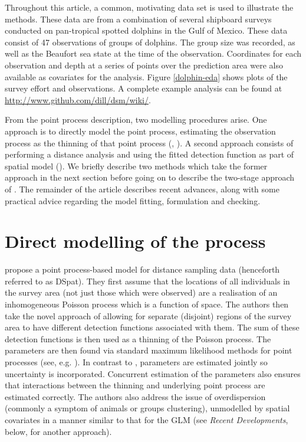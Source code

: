 \documentclass[a4paper,12pt]{article}
\begin{document}
Throughout this article, a common, motivating data set is used to illustrate the methods. These data are from a combination of several shipboard surveys conducted on pan-tropical spotted dolphins in the Gulf of Mexico. These data consist of 47 observations of groups of dolphins. The group size was recorded, as well as the Beaufort sea state at the time of the observation. Coordinates for each observation and depth at a series of points over the prediction area were also available as covariates for the analysis. Figure \ref{dolphin-eda} shows plots of the survey effort and observations. A complete example analysis can be found at \url{http://www.github.com/dill/dsm/wiki/}.

From the point process description, two modelling procedures arise. One approach is to directly model the point process, estimating the observation process as the thinning of that point process (\cite{Niemi:2010kx}, \cite{Johnson:2010gf}). A second approach consists of performing a distance analysis and using the fitted detection function as part of spatial model (\cite{Hedley:2004et}). We briefly describe two methods which take the former approach in the next section before going on to describe the two-stage approach of \cite{Hedley:2004et}. The remainder of the article describes recent advances, along with some practical advice regarding the model fitting, formulation and checking.





\section*{Direct modelling of the process}
\label{s:direct}

\cite{Johnson:2010gf} propose a point process-based model for distance sampling data (henceforth referred to as DSpat). They first assume that the locations of all individuals in the survey area (not just those which were observed) are a realisation of an inhomogeneous Poisson process which is a function of space. The authors then take the novel approach of allowing for separate (disjoint) regions of the survey area to have different detection functions associated with them. The sum of these detection functions is then used as a thinning of the Poisson process. The parameters are then found via standard maximum likelihood methods for point processes (see, e.g. \cite{Baddeley:2000to}). In contrast to \cite{Hedley:2004et}, parameters are estimated jointly so uncertainty is incorporated. Concurrent estimation of the parameters also ensures that interactions between the thinning and underlying point process are estimated correctly. The authors also address the issue of overdispersion (commonly a symptom of animals or groups clustering), unmodelled by spatial covariates in a manner similar to that for the GLM (see \textit{Recent Developments}, below, for another approach). 
\end{document}
